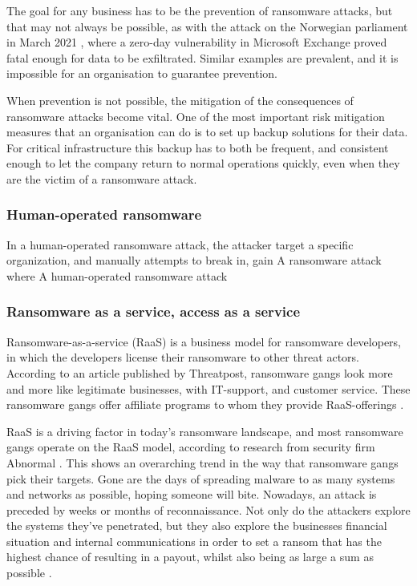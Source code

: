 The goal for any business has to be the prevention of ransomware attacks, but that may not always be possible, as with the attack on the Norwegian parliament in March 2021 \cite{noauthor_stortinget_2021}, where a \gls{zero-day} vulnerability in Microsoft Exchange proved fatal enough for data to be exfiltrated. Similar examples are prevalent, and it is impossible for an organisation to guarantee prevention. 

When prevention is not possible, the mitigation of the consequences of ransomware attacks become vital. One of the most important risk mitigation measures that an organisation can do is to set up backup solutions for their data. For critical infrastructure this backup has to both be frequent, and consistent enough to let the company return to normal operations quickly, even when they are the victim of a ransomware attack. 

\subsubsection{Human-operated ransomware}



In a human-operated ransomware attack, the attacker target a specific organization,
and manually attempts to break in, gain 
A ransomware attack where  
A human-operated ransomware attack 

\subsubsection{Ransomware as a service, access as a service}

Ransomware-as-a-service (RaaS) is a business model for ransomware developers, in which the developers license their ransomware to other threat actors. According to an article published by Threatpost, ransomware gangs look more and more like legitimate businesses, with IT-support, and customer service. These ransomware gangs offer affiliate programs to whom they provide RaaS-offerings \cite{seals_2021_nodate}.

RaaS is a driving factor in today's ransomware landscape, and most ransomware gangs operate on the RaaS model, according to research from security firm Abnormal \cite{noauthor_threat_nodate}. This shows an overarching trend in the way that ransomware gangs pick their targets. Gone are the days of spreading malware to as many systems and networks as possible, hoping someone will bite. Nowadays, an attack is preceded by weeks or months of reconnaissance. Not only do the attackers explore the systems they've penetrated, but they also explore the businesses financial situation and internal communications in order to set a ransom that has the highest chance of resulting in a payout, whilst also being as large a sum as possible \cite{seals_2021_nodate}.

